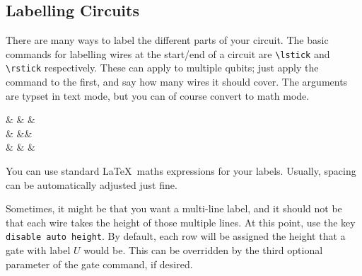 \documentclass[aps,pra,10pt,nofootinbib]{revtex4-2}
\begin{document}


\subsection{Labelling Circuits}

There are many ways to label the different parts of your circuit. The basic commands for labelling wires at the start/end of a circuit are \verb!\lstick! and \verb!\rstick! respectively. These can apply to multiple qubits; just apply the command to the first, and say how many wires it should cover. The arguments are typset in text mode, but you can of course convert to math mode.
\begin{Code}
  \begin{quantikz}
     &  &  & \\
     &  && \\
    & & & 
  \end{quantikz}
\end{Code}
You can use standard \LaTeX\ maths expressions for your labels. Usually, spacing can be automatically adjusted just fine.



Sometimes, it might be that you want a multi-line label, and it should not be that each wire takes the height of those multiple lines. At this point, use the key \verb!disable auto height!. By default, each row will be assigned the height that a gate with label $U$ would be. This can be overridden by the third optional parameter of the gate command, if desired.
\end{document}
